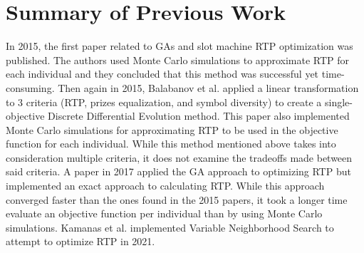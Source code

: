 \documentclass[11pt]{article} %
\begin{document}
\section{Summary of Previous Work}
\par
In 2015, the first paper related to GAs and slot machine RTP optimization was published\cite{balabanov2015slot}.
The authors used Monte Carlo simulations to approximate RTP for each individual and they concluded that this method was successful yet time-consuming.
Then again in 2015, Balabanov et al. applied a linear transformation to 3 criteria (RTP, prizes equalization, and symbol diversity) to create a single-objective Discrete Differential Evolution method\cite{balabanovDDE}.
This paper also implemented Monte Carlo simulations for approximating RTP to be used in the objective function for each individual.
While this method mentioned above takes into consideration multiple criteria, it does not examine the tradeoffs made between said criteria.
A paper in 2017 applied the GA approach to optimizing RTP but implemented an exact approach to calculating RTP\cite{keremedchiev2017slot}.
While this approach converged faster than the ones found in the 2015 papers, it took a longer time evaluate an objective function per individual than by using Monte Carlo simulations.
Kamanas et al. implemented Variable Neighborhood Search to attempt to optimize RTP in 2021\cite{kamanas2021slot}.
\printbibliography[title={References}]
\end{document}
